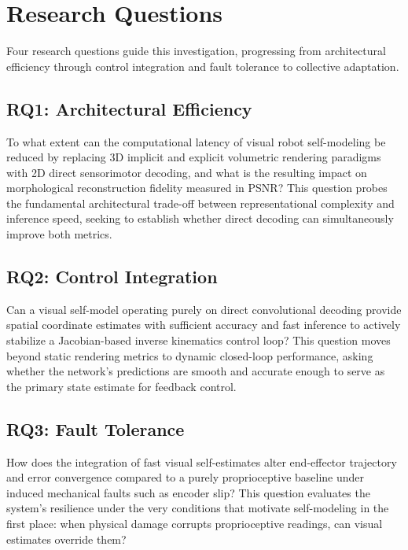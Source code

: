 \documentclass[12pt,a4paper,oneside]{report}
\begin{document}
\section{Research Questions}
\label{sec:research_questions}

Four research questions guide this investigation, progressing from architectural efficiency through control integration and fault tolerance to collective adaptation.

\subsection{RQ1: Architectural Efficiency}
\label{subsec:RQ1}

To what extent can the computational latency of visual robot self-modeling be reduced by replacing 3D implicit and explicit volumetric rendering paradigms with 2D direct sensorimotor decoding, and what is the resulting impact on morphological reconstruction fidelity measured in PSNR? This question probes the fundamental architectural trade-off between representational complexity and inference speed, seeking to establish whether direct decoding can simultaneously improve both metrics.

\subsection{RQ2: Control Integration}
\label{subsec:RQ2}

Can a visual self-model operating purely on direct convolutional decoding provide spatial coordinate estimates with sufficient accuracy and fast inference to actively stabilize a Jacobian-based inverse kinematics control loop? This question moves beyond static rendering metrics to dynamic closed-loop performance, asking whether the network's predictions are smooth and accurate enough to serve as the primary state estimate for feedback control.

\subsection{RQ3: Fault Tolerance}
\label{subsec:RQ3}

How does the integration of fast visual self-estimates alter end-effector trajectory and error convergence compared to a purely proprioceptive baseline under induced mechanical faults such as encoder slip? This question evaluates the system's resilience under the very conditions that motivate self-modeling in the first place: when physical damage corrupts proprioceptive readings, can visual estimates override them?
\end{document}
